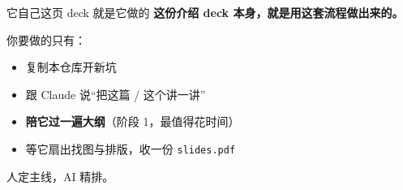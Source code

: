 \begin{frame}{它自己}{这页 deck 就是它做的}
  \textbf{这份介绍 deck 本身，就是用这套流程做出来的。}

  \bigskip
  你要做的只有：
  \begin{itemize}
    \item 复制本仓库开新坑
    \item 跟 Claude 说“把这篇 / 这个讲一讲”
    \item \textbf{陪它过一遍大纲}（阶段 1，最值得花时间）
    \item 等它扇出找图与排版，收一份 \texttt{slides.pdf}
  \end{itemize}

  \bigskip
  \alert{人定主线，AI 精排。}
\end{frame}

